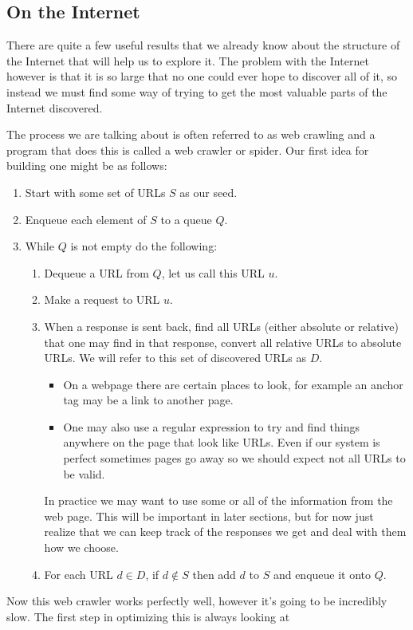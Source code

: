 \documentclass{article}
\begin{document}
	\subsection{On the Internet}
	There are quite a few useful results that we already know about the structure of the Internet that will help us to explore it. The problem with the Internet however is that it is so large that no one could ever hope to discover all of it, so instead we must find some way of trying to get the most valuable parts of the Internet discovered.
	
	The process we are talking about is often referred to as web crawling and a program that does this is called a web crawler or spider. Our first idea for building one might be as follows:
	\begin{enumerate}
		\item Start with some set of URLs $S$ as our seed. 
		\item Enqueue each element of $S$ to a queue $Q$.
		\item While $Q$ is not empty do the following:
		\begin{enumerate}
			\item Dequeue a URL from $Q$, let us call this URL $u$.
			\item Make a request to URL $u$.
			\item When a response is sent back, find all URLs (either absolute or relative) that one may find in that response, convert all relative URLs to absolute URLs. We will refer to this set of discovered URLs as $D$.
			\begin{itemize}
				\item On a webpage there are certain places to look, for example an anchor tag may be a link to another page.
				\item One may also use a regular expression to try and find things anywhere on the page that look like URLs. Even if our system is perfect sometimes pages go away so we should expect not all URLs to be valid.
			\end{itemize}
			In practice we may want to use some or all of the information from the web page. This will be important in later sections, but for now just realize that we can keep track of the responses we get and deal with them how we choose.
			\item For each URL $d\in D$, if $d \not\in S$ then add $d$ to $S$ and enqueue it onto $Q$.
		\end{enumerate}
	\end{enumerate}
	
	Now this web crawler works perfectly well, however it's going to be incredibly slow. The first step in optimizing this is always looking at 
	
	
\end{document}
